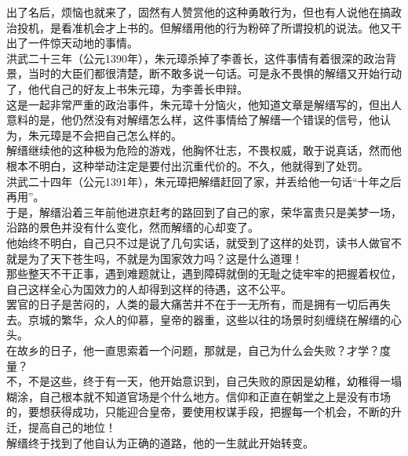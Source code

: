 \begin{multicols}{\theparacolNo}
出了名后，烦恼也就来了，固然有人赞赏他的这种勇敢行为，但也有人说他在搞政治投机，是看准机会才上书的。但解缙用他的行为粉碎了所谓投机的说法。他又干出了一件惊天动地的事情。\\

洪武二十三年（公元1390年），朱元璋杀掉了李善长，这件事情有着很深的政治背景，当时的大臣们都很清楚，断不敢多说一句话。可是永不畏惧的解缙又开始行动了，他代自己的好友上书朱元璋，为李善长申辩。\\

这是一起非常严重的政治事件，朱元璋十分恼火，他知道文章是解缙写的，但出人意料的是，他仍然没有对解缙怎么样，这件事情给了解缙一个错误的信号，他认为，朱元璋是不会把自己怎么样的。\\

解缙继续他的这种极为危险的游戏，他胸怀壮志，不畏权威，敢于说真话，然而他根本不明白，这种举动注定是要付出沉重代价的。不久，他就得到了处罚。\\

洪武二十四年（公元1391年），朱元璋把解缙赶回了家，并丢给他一句话“十年之后再用”。\\

于是，解缙沿着三年前他进京赶考的路回到了自己的家，荣华富贵只是美梦一场，沿路的景色并没有什么变化，然而解缙的心却变了。\\

他始终不明白，自己只不过是说了几句实话，就受到了这样的处罚，读书人做官不就是为了天下苍生吗，不就是为国家效力吗？这是什么道理！\\

那些整天不干正事，遇到难题就让，遇到障碍就倒的无耻之徒牢牢的把握着权位，自己这样全心为国效力的人却得到这样的待遇，这不公平。\\

罢官的日子是苦闷的，人类的最大痛苦并不在于一无所有，而是拥有一切后再失去。京城的繁华，众人的仰慕，皇帝的器重，这些以往的场景时刻缠绕在解缙的心头。\\

在故乡的日子，他一直思索着一个问题，那就是，自己为什么会失败？才学？度量？\\

不，不是这些，终于有一天，他开始意识到，自己失败的原因是幼稚，幼稚得一塌糊涂，自己根本就不知道官场是个什么地方。信仰和正直在朝堂之上是没有市场的，要想获得成功，只能迎合皇帝，要使用权谋手段，把握每一个机会，不断的升迁，提高自己的地位！\\

解缙终于找到了他自认为正确的道路，他的一生就此开始转变。\\


\end{multicols}
